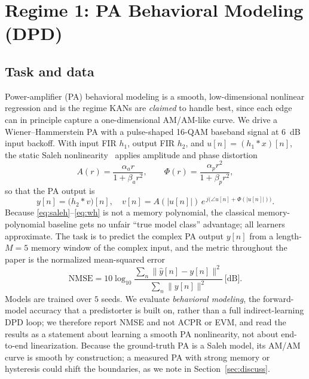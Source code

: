 \documentclass[final,5p,times]{elsarticle}
\begin{document}
\section{Regime 1: PA Behavioral Modeling (DPD)}\label{sec:dpd}
\subsection{Task and data}
Power-amplifier (PA) behavioral modeling is a smooth, low-dimensional nonlinear regression
and is the regime KANs are \emph{claimed} to handle best, since each edge can in principle
capture a one-dimensional AM/AM-like curve. We drive a Wiener--Hammerstein PA with a
pulse-shaped 16-QAM baseband signal at $6$~dB input backoff. With input FIR $h_1$, output FIR
$h_2$, and $u[n]=(h_1{*}x)[n]$, the static Saleh nonlinearity~\cite{saleh1981} applies
amplitude and phase distortion
\begin{equation}
A(r)=\frac{\alpha_a r}{1+\beta_a r^2},\qquad
\Phi(r)=\frac{\alpha_p r^2}{1+\beta_p r^2},
\label{eq:saleh}
\end{equation}
so that the PA output is
\begin{equation}
y[n]=\Big(h_2*v\Big)[n],\quad
v[n]=A(|u[n]|)\,e^{\,j\big(\angle u[n]+\Phi(|u[n]|)\big)} .
\label{eq:wh}
\end{equation}
Because \eqref{eq:saleh}--\eqref{eq:wh} is not a memory polynomial, the classical
memory-polynomial baseline gets no unfair ``true model class'' advantage; all learners
approximate. The task is to predict the complex PA output $y[n]$ from a length-$M{=}5$ memory
window of the complex input, and the metric throughout the paper is the normalized
mean-squared error
\begin{equation}
\mathrm{NMSE}=10\log_{10}\frac{\sum_n \lVert \hat{y}[n]-y[n]\rVert^2}{\sum_n \lVert y[n]\rVert^2}\ \text{[dB]} .
\label{eq:nmse}
\end{equation}
Models are trained over $5$ seeds. We evaluate \emph{behavioral modeling}, the forward-model accuracy
that a predistorter is built on, rather than a full indirect-learning DPD loop; we therefore
report NMSE and not ACPR or EVM, and read the results as a statement about learning a smooth
PA nonlinearity, not about end-to-end linearization. Because the ground-truth PA is a Saleh
model, its AM/AM curve is smooth by construction; a measured PA with strong memory or
hysteresis could shift the boundaries, as we note in Section~\ref{sec:discuss}.
\end{document}
